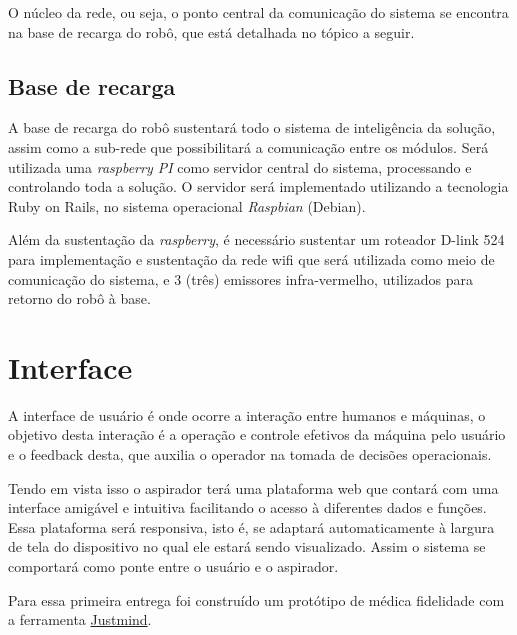 	O núcleo da rede, ou seja, o ponto central da comunicação do sistema se encontra na base de recarga do robô, que está detalhada no tópico a seguir.

	\subsection{Base de recarga}

	A base de recarga do robô sustentará todo o sistema de inteligência da solução, assim como a sub-rede que possibilitará a comunicação entre os módulos. Será utilizada uma \textit{raspberry PI} como servidor central do sistema, processando e controlando toda a solução. O servidor será implementado utilizando a tecnologia Ruby on Rails, no sistema operacional \textit{Raspbian} (Debian).

	Além da sustentação da \textit{raspberry}, é necessário sustentar um roteador D-link 524 para implementação e sustentação da rede wifi que será utilizada como meio de comunicação do sistema, e 3 (três) emissores infra-vermelho, utilizados para retorno do robô à base.
	

\section{Interface} %
\label{sub:interface}
  A interface de usuário é onde ocorre a interação entre humanos e máquinas, o objetivo desta interação é a operação e controle efetivos da máquina pelo usuário e o feedback desta, que auxilia o operador na tomada de decisões operacionais.

  Tendo em vista isso o aspirador terá uma plataforma web que contará com uma interface amigável e intuitiva facilitando o acesso à diferentes dados e funções. Essa plataforma será responsiva, isto é, se adaptará automaticamente à largura de tela do dispositivo no qual ele estará sendo visualizado. Assim o sistema se comportará como ponte entre o usuário e o aspirador.

{Para essa primeira entrega foi construído um protótipo de médica fidelidade com a ferramenta  \href{http://www.justinmind.com/}{Justmind}.}
